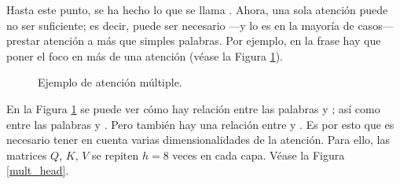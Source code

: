 \begin{center}
\end{center}
\bigskip

\bigskip

Hasta este punto, se ha hecho lo que se llama . Ahora, una sola atención puede no ser suficiente; es decir, puede ser necesario ---y lo es en la mayoría de casos--- prestar atención a más que simples palabras. Por ejemplo, en la frase  hay que poner el foco en más de una atención (véase la Figura \ref{mult_atenc}).
\begin{figure}[H]
    \centering
    \caption{Ejemplo de atención múltiple.}
    \label{mult_atenc}
\end{figure}

\bigskip 

En la Figura \ref{mult_atenc} se puede ver cómo hay relación entre las palabras  y ; así como entre las palabras  y . Pero también hay una relación entre \ul{} y \ul{}. Es por esto que es necesario tener en cuenta varias dimensionalidades de la atención. Para ello, las matrices $Q$, $K$, $V$ se repiten $h = 8$ veces en cada capa. Véase la Figura \ref{mult_head}.

